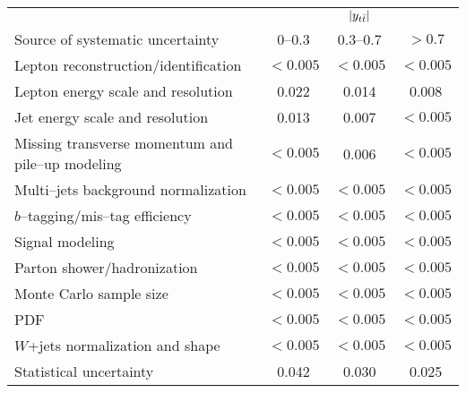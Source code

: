 \begin{table}[!htbp]\centering
\begin{tabular}{l c c c}
\toprule
 & \multicolumn{3}{c}{$|y_{t\bar{t}}{}|$}    \\
Source of systematic uncertainty           &    $0$--$0.3$          &        $0.3$--$0.7$     &  $>0.7$   \\
\midrule
Lepton reconstruction/identification              & $<0.005$ & $<0.005$ & $<0.005$ \\
Lepton energy scale and resolution                & 0.022 & 0.014 & 0.008   \\
Jet energy scale and resolution                   & 0.013 & 0.007 & $<0.005$   \\
Missing transverse momentum and pile--up modeling & $<0.005$ & 0.006 & $<0.005$ \\
Multi--jets background normalization    & $<0.005$ & $<0.005$ & $<0.005$  \\
$b$--tagging/mis--tag efficiency                & $<0.005$ & $<0.005$ & $<0.005$  \\
Signal modeling                        & $<0.005$ & $<0.005$ & $<0.005$  \\
Parton shower/hadronization             & $<0.005$ & $<0.005$ & $<0.005$  \\
Monte Carlo sample size                 & $<0.005$ & $<0.005$ & $<0.005$  \\
PDF                                     & $<0.005$ & $<0.005$ & $<0.005$  \\
$W$+jets normalization and shape        & $<0.005$ & $<0.005$ & $<0.005$  \\
\midrule
Statistical uncertainty                 & 0.042                &        0.030      &        0.025     \\
\bottomrule
\end{tabular}
\caption{}
\label{table:Systematics_ytt}
\end{table}

